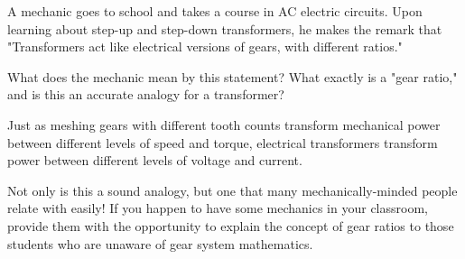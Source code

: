 

A mechanic goes to school and takes a course in AC electric circuits.  Upon learning about step-up and step-down transformers, he makes the remark that "Transformers act like electrical versions of gears, with different ratios."  

What does the mechanic mean by this statement?  What exactly is a "gear ratio," and is this an accurate analogy for a transformer?







Just as meshing gears with different tooth counts transform mechanical power between different levels of speed and torque, electrical transformers transform power between different levels of voltage and current.







Not only is this a sound analogy, but one that many mechanically-minded people relate with easily!  If you happen to have some mechanics in your classroom, provide them with the opportunity to explain the concept of gear ratios to those students who are unaware of gear system mathematics.



